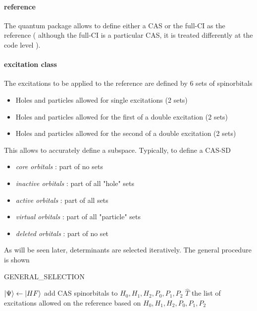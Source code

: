 \documentclass[./thesis.tex]{subfiles}
\begin{document}


\paragraph{reference}

The quantum package allows to define either a CAS or the full-CI as the reference ( although the full-CI is a particular CAS, it is treated differently at the code level ).

\paragraph{excitation class}
The excitations to be applied to the reference are defined by 6 sets of spinorbitals
\begin{itemize}
\item
Holes and particles allowed for single excitations (2 sets)
\item
Holes and particles allowed for the first of a double excitation (2 sets)
\item
Holes and particles allowed for the second of a double excitation (2 sets)
\end{itemize}

This allows to accurately define a subspace. Typically, to define a CAS-SD

\begin{itemize}
\item
\emph{core orbitals} : part of no sets
\item
\emph{inactive orbitals} : part of all "hole" sets
\item
\emph{active orbitals} : part of all sets
\item
\emph{virtual orbitals} : part of all "particle" sets
\item
\emph{deleted orbitals} : part of no set
\end{itemize}


 As will be seen later, determinants are selected iteratively. The general procedure is shown 



\begin{algorithm}
	\caption{GENERAL\_SELECTION}	
	\label{alg:GENERAL_SELECTION}	
	$\ket {\Psi} \gets \ket {HF}$\;
	add CAS spinorbitals to $H_0, H_1, H_2, P_0, P_1, P_2$ \;
	$\hat T$ the list of excitations allowed on the reference based on $H_0, H_1, H_2, P_0, P_1, P_2$ \;
	
\end{algorithm}
\end{document}
